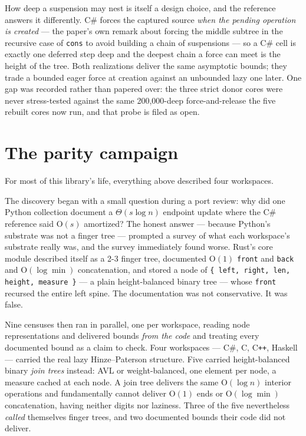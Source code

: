 \documentclass[11pt,twoside,openright]{book}
\newcommand{\code}[1]{\texorpdfstring{\textcolor{d7ink}{\texttt{#1}}}{#1}}
\newcommand{\term}[1]{\textit{#1}}
\newcommand{\bigoh}[1]{$\mathrm{O}(#1)$}
\begin{document}
How deep a suspension may nest is itself a design choice, and the reference
answers it differently. C\# forces the captured source \emph{when the pending
operation is created} --- the paper's own remark about forcing the middle
subtree in the recursive case of \code{cons} to avoid building a chain of
suspensions --- so a C\# cell is exactly one deferred step deep and the deepest
chain a force can meet is the height of the tree. Both realizations deliver the
same asymptotic bounds; they trade a bounded eager force at creation against an
unbounded lazy one later. One gap was recorded rather than papered over: the
three strict donor cores were never stress-tested against the same
200,000-deep force-and-release the five rebuilt cores now run, and that probe is
filed as open.

\section{The parity campaign}
\label{sec:parity}

For most of this library's life, everything above described four workspaces.

The discovery began with a small question during a port review: why did one
Python collection document a $\Theta(s \log n)$ endpoint update where the C\#
reference said \bigoh{s} amortized? The honest answer --- because Python's
substrate was not a finger tree --- prompted a survey of what each workspace's
substrate really was, and the survey immediately found worse. Rust's core module
described itself as a 2-3 finger tree, documented \bigoh{1} \code{front} and
\code{back} and \bigoh{\log \min} concatenation, and stored a node of
\code{\{ left, right, len, height, measure \}} --- a plain height-balanced binary
tree --- whose \code{front} recursed the entire left spine. The documentation was
not conservative. It was false.

Nine censuses then ran in parallel, one per workspace, reading node
representations and delivered bounds \emph{from the code} and treating every
documented bound as a claim to check. Four workspaces --- C\#, C, C\texttt{++},
Haskell --- carried the real lazy Hinze--Paterson structure. Five carried
height-balanced binary \term{join trees} instead: AVL or
weight-balanced, one element per node, a measure cached at each node. A join tree
delivers the same \bigoh{\log n} interior operations and fundamentally cannot
deliver \bigoh{1} ends or \bigoh{\log \min} concatenation, having neither digits
nor laziness. Three of the five nevertheless \emph{called} themselves finger
trees, and two documented bounds their code did not deliver.
\end{document}
